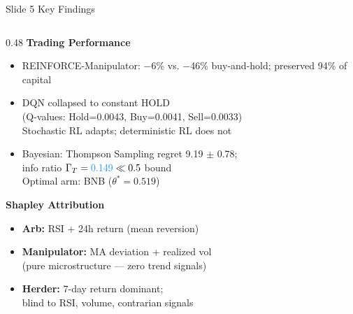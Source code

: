 \documentclass[aspectratio=169, 10pt]{beamer}
\newcommand{\blu}[1]{{\color{accentblue}#1}}
\newcommand{\red}[1]{{\color{cornellred}#1}}
\begin{document}
\begin{frame}[t]{Slide 5 \quad Key Findings}
\vspace{2pt}
\begin{columns}[T]

  \begin{column}{0.48\textwidth}
    \textbf{\small\textcolor{cornellred}{Trading Performance}}
    \begin{itemize}\setlength\itemsep{2pt}\small
      \item \red{REINFORCE-Manipulator:} \blu{$-$6\%} vs.
            $-$46\% buy-and-hold; preserved \blu{94\%} of capital
      \item DQN collapsed to constant HOLD\\
            (Q-values: Hold=0.0043, Buy=0.0041, Sell=0.0033)\\
            Stochastic RL adapts; deterministic RL does not
      \item Bayesian: Thompson Sampling regret \blu{9.19 $\pm$ 0.78};\\
            info ratio $\Gamma_T = \blu{0.149} \ll 0.5$ bound\\
            Optimal arm: \blu{BNB} ($\theta^*=0.519$)
    \end{itemize}

    \vspace{4pt}
    \textbf{\small\textcolor{cornellred}{Shapley Attribution}}
    \begin{itemize}\setlength\itemsep{2pt}\small
      \item \textcolor{accentblue}{\textbf{Arb:}} RSI + 24h return (mean reversion)
      \item \textcolor{cornellred}{\textbf{Manipulator:}} MA deviation + realized vol\\
            (pure microstructure --- zero trend signals)
      \item \textcolor{accentgreen}{\textbf{Herder:}} 7-day return dominant;\\
            blind to RSI, volume, contrarian signals
    \end{itemize}
  \end{column}


\end{columns}
\end{frame}
\end{document}

